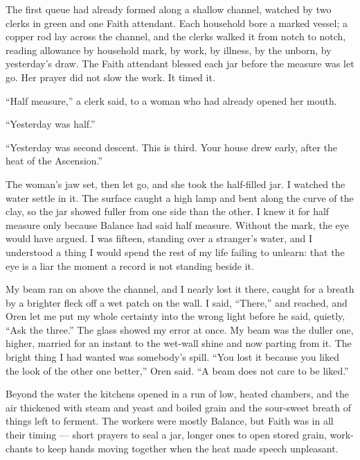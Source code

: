 The first queue had already formed along a shallow channel, watched by two clerks in green and one Faith attendant. Each household bore a marked vessel; a copper rod lay across the channel, and the clerks walked it from notch to notch, reading allowance by household mark, by work, by illness, by the unborn, by yesterday's draw. The Faith attendant blessed each jar before the measure was let go. Her prayer did not slow the work. It timed it.\par

``Half measure,'' a clerk said, to a woman who had already opened her mouth.\par

``Yesterday was half.''\par

``Yesterday was second descent. This is third. Your house drew early, after the heat of the Ascension.''\par

The woman's jaw set, then let go, and she took the half-filled jar. I watched the water settle in it. The surface caught a high lamp and bent along the curve of the clay, so the jar showed fuller from one side than the other. I knew it for half measure only because Balance had said half measure. Without the mark, the eye would have argued. I was fifteen, standing over a stranger's water, and I understood a thing I would spend the rest of my life failing to unlearn: that the eye is a liar the moment a record is not standing beside it.\par

My beam ran on above the channel, and I nearly lost it there, caught for a breath by a brighter fleck off a wet patch on the wall. I said, ``There,'' and reached, and Oren let me put my whole certainty into the wrong light before he said, quietly, ``Ask the three.'' The glass showed my error at once. My beam was the duller one, higher, married for an instant to the wet-wall shine and now parting from it. The bright thing I had wanted was somebody's spill. ``You lost it because you liked the look of the other one better,'' Oren said. ``A beam does not care to be liked.''\par

\ornament

\noindent Beyond the water the kitchens opened in a run of low, heated chambers, and the air thickened with steam and yeast and boiled grain and the sour-sweet breath of things left to ferment. The workers were mostly Balance, but Faith was in all their timing --- short prayers to seal a jar, longer ones to open stored grain, work-chants to keep hands moving together when the heat made speech unpleasant.\par

